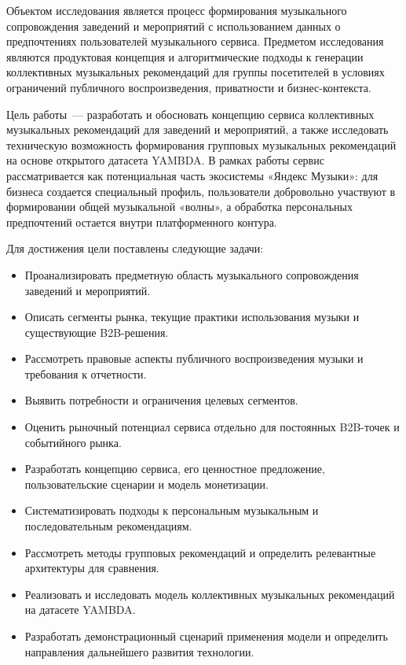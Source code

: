 Объектом исследования является процесс формирования музыкального сопровождения заведений и мероприятий с использованием данных о предпочтениях пользователей музыкального сервиса. Предметом исследования являются продуктовая концепция и алгоритмические подходы к генерации коллективных музыкальных рекомендаций для группы посетителей в условиях ограничений публичного воспроизведения, приватности и бизнес-контекста.

Цель работы~--- разработать и обосновать концепцию сервиса коллективных музыкальных рекомендаций для заведений и мероприятий, а также исследовать техническую возможность формирования групповых музыкальных рекомендаций на основе открытого датасета YAMBDA. В рамках работы сервис рассматривается как потенциальная часть экосистемы «Яндекс Музыки»: для бизнеса создается специальный профиль, пользователи добровольно участвуют в формировании общей музыкальной «волны», а обработка персональных предпочтений остается внутри платформенного контура.

Для достижения цели поставлены следующие задачи:

\begin{itemize}
  \setlength{\itemsep}{0pt}
  \setlength{\parsep}{0pt}
  \item Проанализировать предметную область музыкального сопровождения заведений и мероприятий.
  \item Описать сегменты рынка, текущие практики использования музыки и существующие B2B-решения.
  \item Рассмотреть правовые аспекты публичного воспроизведения музыки и требования к отчетности.
  \item Выявить потребности и ограничения целевых сегментов.
  \item Оценить рыночный потенциал сервиса отдельно для постоянных B2B-точек и событийного рынка.
  \item Разработать концепцию сервиса, его ценностное предложение, пользовательские сценарии и модель монетизации.
  \item Систематизировать подходы к персональным музыкальным и последовательным рекомендациям.
  \item Рассмотреть методы групповых рекомендаций и определить релевантные архитектуры для сравнения.
  \item Реализовать и исследовать модель коллективных музыкальных рекомендаций на датасете YAMBDA.
  \item Разработать демонстрационный сценарий применения модели и определить направления дальнейшего развития технологии.
\end{itemize}


